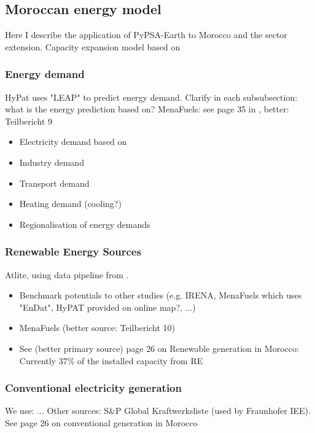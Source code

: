 \subsection{Moroccan energy model}
\label{subsec:moroccan_model}
Here I describe the application of PyPSA-Earth \cite{Parzen2022} to Morocco and the sector extension.
Capacity expansion model based on \cite{Brown2018}

\subsubsection{Energy demand}
HyPat uses "LEAP" to predict energy demand.
Clarify in each subsubsection: what is the energy prediction based on?
MenaFuels: see page 35 in \cite{Ersoy2022}, better: Teilbericht 9
\begin{itemize}
    \item Electricity demand based on \cite{Parzen2022}
    \item Industry demand
    \item Transport demand
    \item Heating demand (cooling?) 
    \item Regionalisation of energy demands
\end{itemize}


\subsubsection{Renewable Energy Sources}
Atlite, using data pipeline from \cite{Parzen2022}.

\begin{itemize}
    \item Benchmark potentials to other studies (e.g. IRENA, MenaFuels which uses "EnDat", HyPAT provided on online map?, ...)
    \item MenaFuels \cite[p. 25]{Ersoy2022} (better source: Teilbericht 10)
    \item See \cite{Ersoy2022} (better primary source) page 26 on Renewable generation in Morocco: Currently 37\% of the installed capacity from RE
\end{itemize}



\subsubsection{Conventional electricity generation}
We use: ...
Other sources: S\&P Global Kraftwerksliste (used by Fraunhofer IEE).
See \cite{Ersoy2022} page 26 on conventional generation in Morocco


